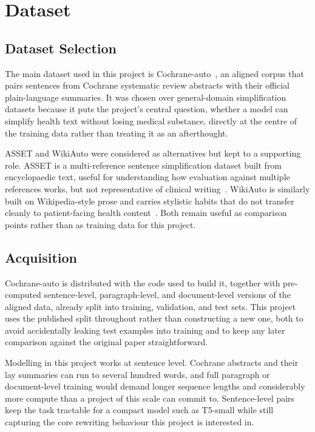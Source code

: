 \chapter{Dataset}
\label{ch:dataset}

\section{Dataset Selection}
\label{sec:dataset-selection}

The main dataset used in this project is Cochrane-auto~\cite{bakker2024cochraneauto}, an aligned corpus that pairs sentences from Cochrane systematic review abstracts with their official plain-language summaries. It was chosen over general-domain simplification datasets because it puts the project's central question, whether a model can simplify health text without losing medical substance, directly at the centre of the training data rather than treating it as an afterthought.

ASSET and WikiAuto were considered as alternatives but kept to a supporting role. ASSET is a multi-reference sentence simplification dataset built from encyclopaedic text, useful for understanding how evaluation against multiple references works, but not representative of clinical writing~\cite{alvamanchego2020asset}. WikiAuto is similarly built on Wikipedia-style prose and carries stylistic habits that do not transfer cleanly to patient-facing health content~\cite{jiang2020wikiauto}. Both remain useful as comparison points rather than as training data for this project.

\section{Acquisition}
\label{sec:acquisition}

Cochrane-auto is distributed with the code used to build it, together with pre-computed sentence-level, paragraph-level, and document-level versions of the aligned data, already split into training, validation, and test sets. This project uses the published split throughout rather than constructing a new one, both to avoid accidentally leaking test examples into training and to keep any later comparison against the original paper straightforward.

Modelling in this project works at sentence level. Cochrane abstracts and their lay summaries can run to several hundred words, and full paragraph or document-level training would demand longer sequence lengths and considerably more compute than a project of this scale can commit to. Sentence-level pairs keep the task tractable for a compact model such as T5-small while still capturing the core rewriting behaviour this project is interested in.

